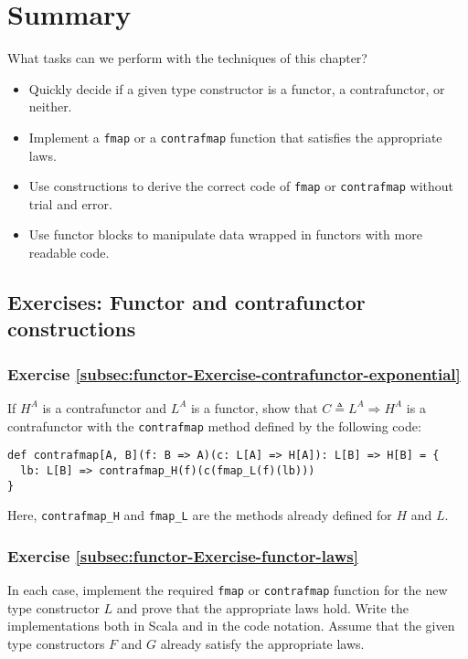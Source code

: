 \section{Summary}

What tasks can we perform with the techniques of this chapter?
\begin{itemize}
\item Quickly decide if a given type constructor is a functor, a contrafunctor,
or neither.
\item Implement a \lstinline!fmap! or a \lstinline!contrafmap! function
that satisfies the appropriate laws.
\item Use constructions to derive the correct code of \lstinline!fmap!
or \lstinline!contrafmap! without trial and error.
\item Use functor blocks to manipulate data wrapped in functors with more
readable code.
\end{itemize}


\subsection{Exercises: Functor and contrafunctor constructions }

\subsubsection{Exercise \label{subsec:functor-Exercise-contrafunctor-exponential}\ref{subsec:functor-Exercise-contrafunctor-exponential}}

If $H^{A}$ is a contrafunctor and $L^{A}$ is a functor, show that
$C\triangleq L^{A}\Rightarrow H^{A}$ is a contrafunctor with the
\lstinline!contrafmap! method defined by the following code:
\begin{lstlisting}
def contrafmap[A, B](f: B => A)(c: L[A] => H[A]): L[B] => H[B] = {
  lb: L[B] => contrafmap_H(f)(c(fmap_L(f)(lb)))
}
\end{lstlisting}
Here, \lstinline!contrafmap_H! and \lstinline!fmap_L! are the methods
already defined for $H$ and $L$.

\subsubsection{Exercise \label{subsec:functor-Exercise-functor-laws}\ref{subsec:functor-Exercise-functor-laws}}

In each case, implement the required \lstinline!fmap! or \lstinline!contrafmap!
function for the new type constructor $L$ and prove that the appropriate
laws hold. Write the implementations both in Scala and in the code
notation. Assume that the given type constructors $F$ and $G$ already
satisfy the appropriate laws.


